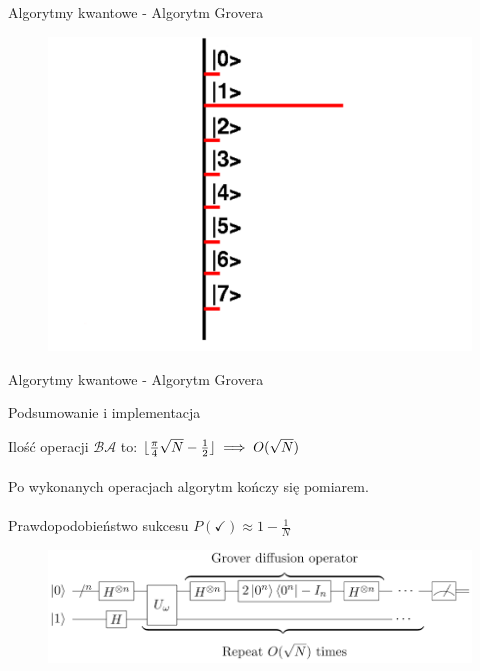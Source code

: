 \documentclass{beamer}
\DeclarePairedDelimiter\floor{\lfloor}{\rfloor}
\begin{document}
	
	\begin{frame}{Algorytmy kwantowe - Algorytm Grovera}
		\vspace{0.5em}
		\begin{center}
			\begin{figure}
				\includegraphics[scale=0.28]{media/visualization7.png}
			\end{figure}
		\end{center}
		\vspace{0.5em}
	\end{frame}	
		
	\begin{frame}{Algorytmy kwantowe - Algorytm Grovera}
		\vspace{0.5em}

	
		\begin{block}{Podsumowanie i implementacja}
			\vspace{0.5em}
			
			Ilość operacji $\mathcal{B}\mathcal{A}$ to: $\floor{\frac{\pi}{4}\sqrt{N} - \frac{1}{2}}\implies O(\sqrt{N})$ \\~\\
			Po wykonanych operacjach algorytm kończy się pomiarem.\\~\\
			Prawdopodobieństwo sukcesu $P(\checkmark) \approx 1 - \frac{1}{N} $
			\begin{center}
				\begin{figure}
					\includegraphics[scale=0.55]{media/groverCircuit.png}
				\end{figure}
			\end{center}
		\vspace{1em}	
		\end{block}
	\end{frame}
\end{document}
